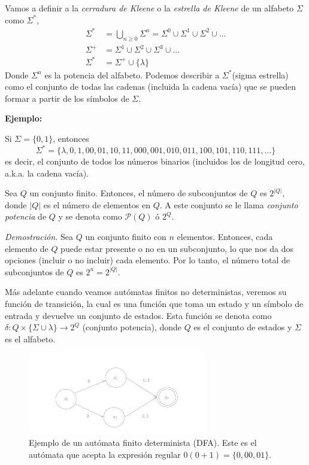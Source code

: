 \begin{Def}
Vamos a definir a la \textit{cerradura de Kleene} o la \textit{estrella de Kleene} de un alfabeto $\Sigma$ como $\Sigma^*$,  
\begin{align*}
    \Sigma^* &= \bigcup_{n \geq 0} \Sigma^n = \Sigma^0 \cup \Sigma^1 \cup \Sigma^2 \cup \ldots \\
    \Sigma^+ &= \Sigma^1 \cup \Sigma^2 \cup \Sigma^3 \cup \ldots \\ 
    \Sigma^* &= \Sigma^+ \cup \{\lambda\}
\end{align*}
Donde $\Sigma^n$ es la potencia del alfabeto. Podemos describir a $\Sigma^*$(sigma estrella) como el conjunto de todas las cadenas (incluida la cadena vacía) 
que se pueden formar a partir de los símbolos de $\Sigma$.
\end{Def}
\textbf{Ejemplo:}

Si $\Sigma = \{0,1\}$, entonces $$\Sigma^* = \{\lambda, 0, 1, 00, 01, 10, 11, 000, 001, 010, 011, 100, 101, 110, 111, \ldots\}$$
es decir, el conjunto de todos los números binarios (incluidos los de longitud cero, a.k.a. la cadena vacía).

\begin{Lem}
Sea $Q$ un conjunto finito. Entonces, el número de subconjuntos de $Q$ es $2^{|Q|}$, donde $|Q|$ es el número de elementos en $Q$. A este conjunto se le llama \textit{conjunto potencia} de $Q$ y se denota como $\mathcal{P}(Q)$ ó $2^Q$.
\end{Lem}

\textit{Demostración.} Sea $Q$ un conjunto finito con $n$ elementos. Entonces, cada elemento de $Q$ puede estar presente o no en un subconjunto, 
lo que nos da dos opciones (incluir o no incluir) cada elemento. Por lo tanto, el número total de subconjuntos de $Q$ es $2^n = 2^{|Q|}$. \qedsymbol

\newpage
Más adelante cuando veamos autómatas finitos no deterministas, veremos su función de transición, la cual es una función que toma un estado y un símbolo de entrada y devuelve un conjunto de estados. 
Esta función se denota como $\delta: Q \times \{\Sigma \cup \lambda\}\to 2^Q$ (conjunto potencia), donde $Q$ es el conjunto de estados y $\Sigma$ es el alfabeto. 
\begin{figure}
    \centering
    \includegraphics[width=0.7\textwidth]{images/dfa1.png}
    \caption{Ejemplo de un autómata finito determinista (DFA). Este es el autómata que acepta la expresión regular $0(0+1) = \{0, 00, 01\}$.}
\end{figure}

